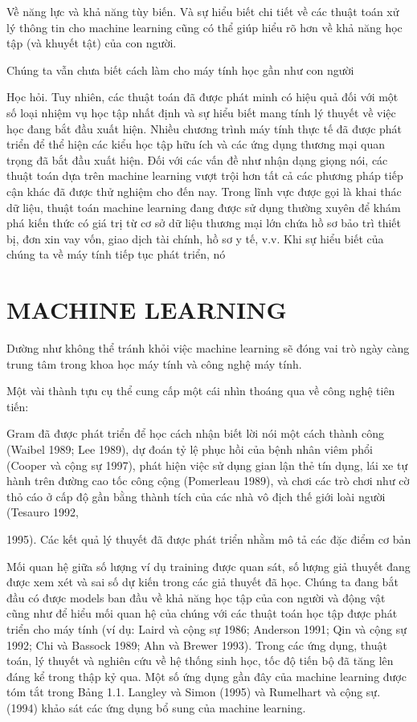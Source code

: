 Về năng lực và khả năng tùy biến. Và sự hiểu biết chi tiết về các thuật toán xử lý thông tin cho machine learning cũng có thể giúp hiểu rõ hơn về khả năng học tập (và khuyết tật) của con người.

Chúng ta vẫn chưa biết cách làm cho máy tính học gần như con người

Học hỏi. Tuy nhiên, các thuật toán đã được phát minh có hiệu quả đối với một số loại nhiệm vụ học tập nhất định và sự hiểu biết mang tính lý thuyết về việc học đang bắt đầu xuất hiện. Nhiều chương trình máy tính thực tế đã được phát triển để thể hiện các kiểu học tập hữu ích và các ứng dụng thương mại quan trọng đã bắt đầu xuất hiện. Đối với các vấn đề như nhận dạng giọng nói, các thuật toán dựa trên machine learning vượt trội hơn tất cả các phương pháp tiếp cận khác đã được thử nghiệm cho đến nay. Trong lĩnh vực được gọi là khai thác dữ liệu, thuật toán machine learning đang được sử dụng thường xuyên để khám phá kiến ​​thức có giá trị từ cơ sở dữ liệu thương mại lớn chứa hồ sơ bảo trì thiết bị, đơn xin vay vốn, giao dịch tài chính, hồ sơ y tế, v.v. Khi sự hiểu biết của chúng ta về máy tính tiếp tục phát triển, nó

\section{MACHINE LEARNING}

Dường như không thể tránh khỏi việc machine learning sẽ đóng vai trò ngày càng trung tâm trong khoa học máy tính và công nghệ máy tính.

Một vài thành tựu cụ thể cung cấp một cái nhìn thoáng qua về công nghệ tiên tiến:

Gram đã được phát triển để học cách nhận biết lời nói một cách thành công (Waibel 1989; Lee 1989), dự đoán tỷ lệ phục hồi của bệnh nhân viêm phổi (Cooper và cộng sự 1997), phát hiện việc sử dụng gian lận thẻ tín dụng, lái xe tự hành trên đường cao tốc công cộng (Pomerleau 1989), và chơi các trò chơi như cờ thỏ cáo ở cấp độ gần bằng thành tích của các nhà vô địch thế giới loài người (Tesauro 1992,

1995). Các kết quả lý thuyết đã được phát triển nhằm mô tả các đặc điểm cơ bản

Mối quan hệ giữa số lượng ví dụ training được quan sát, số lượng giả thuyết đang được xem xét và sai số dự kiến ​​trong các giả thuyết đã học. Chúng ta đang bắt đầu có được models ban đầu về khả năng học tập của con người và động vật cũng như để hiểu mối quan hệ của chúng với các thuật toán học tập được phát triển cho máy tính (ví dụ: Laird và cộng sự 1986; Anderson 1991; Qin và cộng sự 1992; Chi và Bassock 1989; Ahn và Brewer 1993). Trong các ứng dụng, thuật toán, lý thuyết và nghiên cứu về hệ thống sinh học, tốc độ tiến bộ đã tăng lên đáng kể trong thập kỷ qua. Một số ứng dụng gần đây của machine learning được tóm tắt trong Bảng 1.1. Langley và Simon (1995) và Rumelhart và cộng sự. (1994) khảo sát các ứng dụng bổ sung của machine learning.

